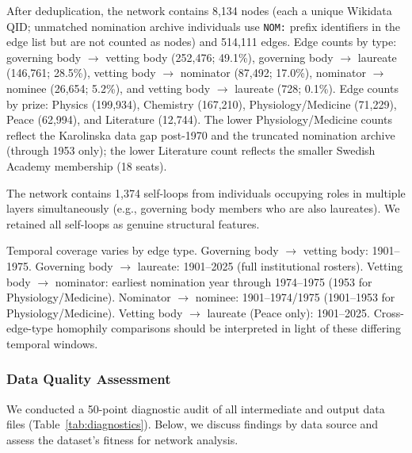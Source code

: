 \documentclass[12pt]{article}
\begin{document}
After deduplication, the network contains 8,134 nodes (each a unique Wikidata QID; unmatched nomination archive individuals use \texttt{NOM:} prefix identifiers in the edge list but are not counted as nodes) and 514,111 edges. Edge counts by type: governing body $\to$ vetting body (252,476; 49.1\%), governing body $\to$ laureate (146,761; 28.5\%), vetting body $\to$ nominator (87,492; 17.0\%), nominator $\to$ nominee (26,654; 5.2\%), and vetting body $\to$ laureate (728; 0.1\%). Edge counts by prize: Physics (199,934), Chemistry (167,210), Physiology/Medicine (71,229), Peace (62,994), and Literature (12,744). The lower Physiology/Medicine counts reflect the Karolinska data gap post-1970 and the truncated nomination archive (through 1953 only); the lower Literature count reflects the smaller Swedish Academy membership (18 seats).

The network contains 1,374 self-loops from individuals occupying roles in multiple layers simultaneously (e.g., governing body members who are also laureates). We retained all self-loops as genuine structural features.

Temporal coverage varies by edge type. Governing body $\to$ vetting body: 1901--1975. Governing body $\to$ laureate: 1901--2025 (full institutional rosters). Vetting body $\to$ nominator: earliest nomination year through 1974--1975 (1953 for Physiology/Medicine). Nominator $\to$ nominee: 1901--1974/1975 (1901--1953 for Physiology/Medicine). Vetting body $\to$ laureate (Peace only): 1901--2025. Cross-edge-type homophily comparisons should be interpreted in light of these differing temporal windows.

\subsubsection*{Data Quality Assessment}

We conducted a 50-point diagnostic audit of all intermediate and output data files (Table~\ref{tab:diagnostics}). Below, we discuss findings by data source and assess the dataset's fitness for network analysis.
\end{document}
